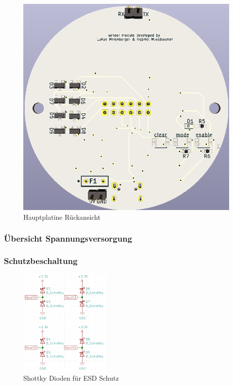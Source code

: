 \begin{figure}[h!]
\begin{minipage}[t]{0.4\linewidth}
		\includegraphics[width=1\textwidth]{graphics/Hauptplatine_hinten.png}
		\caption{Hauptplatine Rückansicht}
		\label{pic: Hauptplatine_hinten}
	\end{minipage}
\end{figure}

\subsubsection{Übersicht Spannungsversorgung}


\subsubsection{Schutzbeschaltung}

\begin{figure}[h!]
	\centering
	\includegraphics[width=0.4\textwidth]{graphics/shematics_sensor_Shottky.png}
	\caption{Shottky Dioden für ESD Schutz}
	\label{pic: Sensor_Shottky}
\end{figure}


